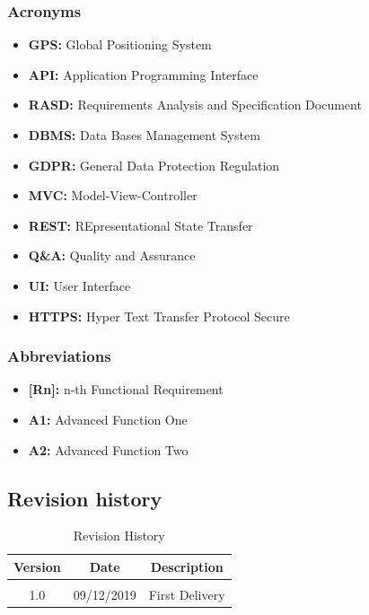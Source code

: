 \documentclass{article}
\begin{document}
	
		\subsubsection{Acronyms}
			\begin{itemize}
				\item {\bf GPS:} Global Positioning System
				\item {\bf API:} Application Programming Interface
				\item {\bf RASD:} Requirements Analysis and Specification Document
				\item {\bf DBMS:} Data Bases Management System
				\item {\bf GDPR:} General Data Protection Regulation
				\item {\bf MVC:} Model-View-Controller
				\item {\bf REST:} REpresentational State Transfer
				\item {\bf Q\&A:} Quality and Assurance
				\item {\bf UI:} User Interface
				\item {\bf HTTPS:} Hyper Text Transfer Protocol Secure
			\end{itemize}
		
		\subsubsection{Abbreviations}
			\begin{itemize}
				\item {\bf [Rn]:} n-th Functional Requirement
				\item {\bf A1:} Advanced Function One
				\item {\bf A2:} Advanced Function Two 
			\end{itemize}
	
	
		\subsection{Revision history}
			\begin{table}[ht]
				\centering
				\begin{tabular}{ccc} 
				Version & Date & Description  \\ 
				\hline
		 		\\1.0 & 09/12/2019 & First Delivery
		 		\\
			\end{tabular}
			\caption{Revision History}
			\label{default}
		\end{table}
	
\end{document}
